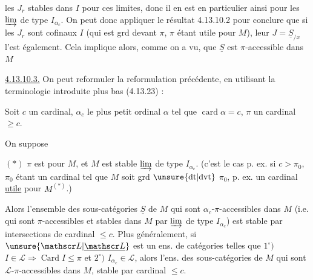
  les $J_r$ stables dans $I$ pour ces limites,
donc il en est en particulier ainsi pour les $\varinjlim$
de type $I_{\alpha_c}$. On peut donc appliquer le résultat
4.13.10.2 pour conclure que si les $J_r$ sont
cofinaux  $I$ (qui est grd devant $\pi$, $\pi$ étant utile
pour $M$), leur $J=\underline S_{/x}$ l'est également. Cela implique
alors, comme on a vu, que $\underline S$ est $\pi$-accessible
dans $M$

\uline{4.13.10.3.} On peut reformuler la reformulation
précédente, en utilisant la terminologie introduite
plus bas (4.13.23) :

Soit $c$ un cardinal,  $\alpha_c$ le plus petit
ordinal $\alpha$ tel que $\operatorname{card}\alpha=c$, $\pi$ un cardinal $\geq c$.

On suppose

$(*)$  $\pi$ est  pour $M$, et $M$ est stable  $\varinjlim$ de
type $I_{\alpha_c}$. (c'est le cas p. ex. si  $c>\pi_0$, $\pi_0$ étant un
cardinal  tel que $M$ soit grd $\unsure{\mathrm{dt}|\mathrm{dvt}}$ $\pi_0$, p. ex. un
cardinal \uline{utile} pour $M^{(*)}$.)

Alors l'ensemble des sous-catégories $\underline S$ de $M$ qui
sont $\alpha_c$-$\pi$-accessibles dans $M$ (i.e. qui sont
$\pi$-accessibles et stables dans $M$ par $\varinjlim$ de type $I_{\alpha_c}$)
est stable par intersections de cardinal $\leq c$. Plus
généralement, si $\unsure{\mathscr L|\underline{\mathscr L}}$ est un ens. de catégories
telles que $1^\circ)$ $I\in\mathscr L\Longrightarrow\operatorname{Card} I\leq\pi$ et $2^\circ)$ $I_{\alpha_c}\in\mathscr L$,
alors l'ens. des sous-catégories de $M$ qui sont
$\mathscr L$-$\pi$-accessibles dans $M$,  stable par 
 cardinal $\leq c$.
